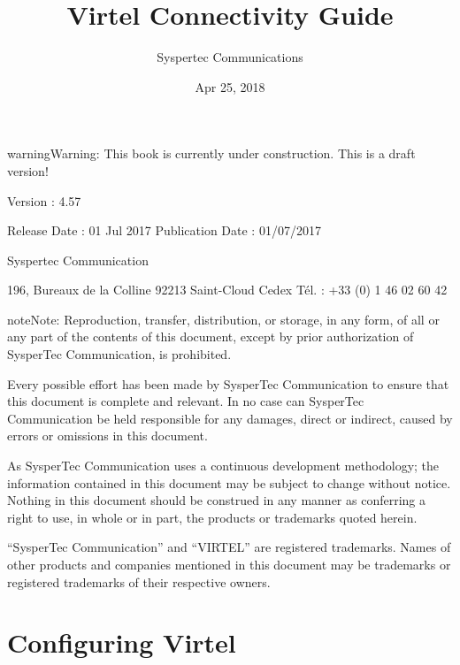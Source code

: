 \documentclass[letterpaper,10pt,english]{sphinxmanual}
\title{Virtel Connectivity Guide}
\date{Apr 25, 2018}
\author{Syspertec Communications}
\begin{document}
\maketitle
\sphinxtableofcontents
{}\label{\detokenize{connectivity_guide::doc}}




\begin{sphinxadmonition}{warning}{Warning:}
This book is currently under construction. This is a draft version!
\end{sphinxadmonition}

Version : 4.57

Release Date : 01 Jul 2017 Publication Date : 01/07/2017

Syspertec Communication

196, Bureaux de la Colline 92213 Saint-Cloud Cedex Tél. : +33 (0) 1 46 02 60 42


\begin{sphinxadmonition}{note}{Note:}
Reproduction, transfer, distribution, or storage, in any form, of all or any part of
the contents of this document, except by prior authorization of SysperTec
Communication, is prohibited.

Every possible effort has been made by SysperTec Communication to ensure that this document
is complete and relevant. In no case can SysperTec Communication be held responsible for
any damages, direct or indirect, caused by errors or omissions in this document.

As SysperTec Communication uses a continuous development methodology; the information
contained in this document may be subject to change without notice. Nothing in this
document should be construed in any manner as conferring a right to use, in whole or in
part, the products or trademarks quoted herein.

“SysperTec Communication” and “VIRTEL” are registered trademarks. Names of other products
and companies mentioned in this document may be trademarks or registered trademarks of
their respective owners.
\end{sphinxadmonition}


\chapter{Configuring Virtel}
\label{\detokenize{connectivity_guide:v457cn-introduction}}\label{\detokenize{connectivity_guide:configuring-virtel}}\label{\detokenize{connectivity_guide:connectivity-reference-v4-57}}\label{\detokenize{connectivity_guide:virtel457cn}}
\end{document}
